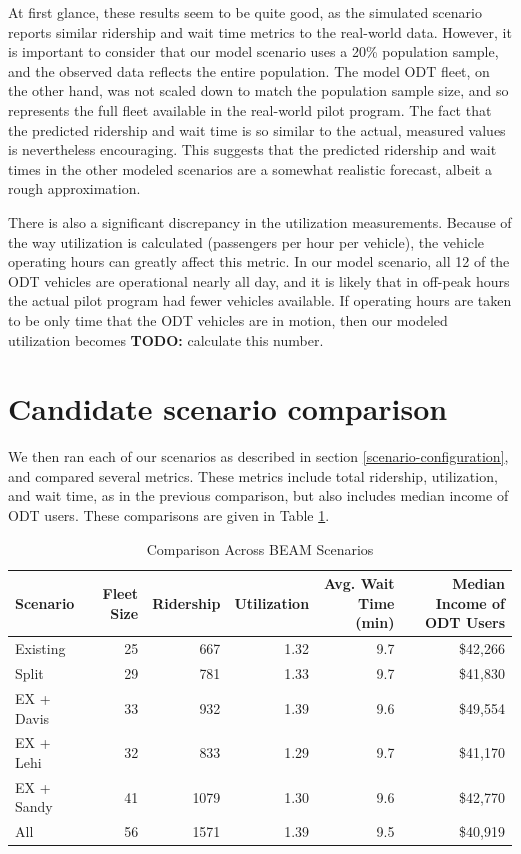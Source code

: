 \documentclass[
]{report}
\begin{document}
At first glance, these results seem to be quite good, as the simulated scenario reports similar ridership and wait time metrics to the real-world data. However, it is important to consider that our model scenario uses a 20\% population sample, and the observed data reflects the entire population. The model ODT fleet, on the other hand, was not scaled down to match the population sample size, and so represents the full fleet available in the real-world pilot program. The fact that the predicted ridership and wait time is so similar to the actual, measured values is nevertheless encouraging. This suggests that the predicted ridership and wait times in the other modeled scenarios are a somewhat realistic forecast, albeit a rough approximation.

There is also a significant discrepancy in the utilization measurements. Because of the way utilization is calculated (passengers per hour per vehicle), the vehicle operating hours can greatly affect this metric. In our model scenario, all 12 of the ODT vehicles are operational nearly all day, and it is likely that in off-peak hours the actual pilot program had fewer vehicles available. If operating hours are taken to be only time that the ODT vehicles are in motion, then our modeled utilization becomes \textbf{TODO:} calculate this number.

\hypertarget{candidate-scenario-comparison}{%
\section{Candidate scenario comparison}\label{candidate-scenario-comparison}}

We then ran each of our scenarios as described in section \ref{scenario-configuration}, and compared several metrics. These metrics include total ridership, utilization, and wait time, as in the previous comparison, but also includes median income of ODT users. These comparisons are given in Table \ref{tab:scenario-compare}.

\begin{table}

\caption{\label{tab:scenario-compare}Comparison Across BEAM Scenarios}
\centering
\begin{tabular}[t]{lrrrrr}
\toprule
Scenario & Fleet Size & Ridership & Utilization & Avg. Wait Time (min) & Median Income of ODT Users\\
\midrule
Existing & 25 & 667 & 1.32 & 9.7 & \$42,266\\
Split & 29 & 781 & 1.33 & 9.7 & \$41,830\\
EX + Davis & 33 & 932 & 1.39 & 9.6 & \$49,554\\
EX + Lehi & 32 & 833 & 1.29 & 9.7 & \$41,170\\
EX + Sandy & 41 & 1079 & 1.30 & 9.6 & \$42,770\\
\addlinespace
All & 56 & 1571 & 1.39 & 9.5 & \$40,919\\
\bottomrule
\end{tabular}
\end{table}
\end{document}
